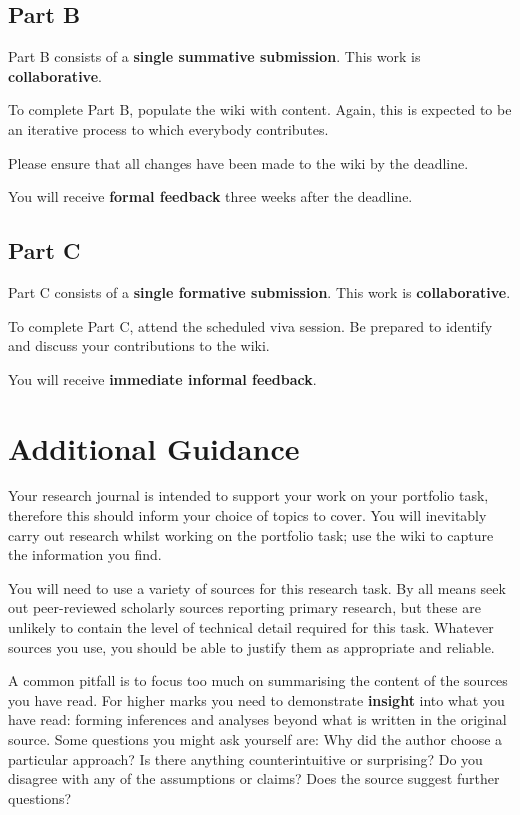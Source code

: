 \documentclass{../../fal_assignment}
\begin{document}
\subsection*{Part B}

Part B consists of a \textbf{single summative submission}. This work is \textbf{collaborative}.

To complete Part B, populate the wiki with content.
Again, this is expected to be an iterative process to which everybody contributes.

Please ensure that all changes have been made to the wiki by the deadline. 

You will receive \textbf{formal feedback} three weeks after the deadline.

\subsection*{Part C}

Part C consists of a \textbf{single formative submission}. This work is \textbf{collaborative}.

To complete Part C, attend the scheduled viva session.
Be prepared to identify and discuss your contributions to the wiki.

You will receive \textbf{immediate informal feedback}.

\section*{Additional Guidance}

Your research journal is intended to support your work on your portfolio task,
therefore this should inform your choice of topics to cover.
You will inevitably carry out research whilst working on the portfolio task;
use the wiki to capture the information you find.

You will need to use a variety of sources for this research task.
By all means seek out peer-reviewed scholarly sources reporting primary research,
but these are unlikely to contain the level of technical detail required for this task.
Whatever sources you use, you should be able to justify them as appropriate and reliable.

A common pitfall is to focus too much on summarising the content of the sources you have read.
For higher marks you need to demonstrate \textbf{insight} into what you have read:
forming inferences and analyses beyond what is written in the original source.
Some questions you might ask yourself are:
Why did the author choose a particular approach?
Is there anything counterintuitive or surprising?
Do you disagree with any of the assumptions or claims?
Does the source suggest further questions?
\end{document}
